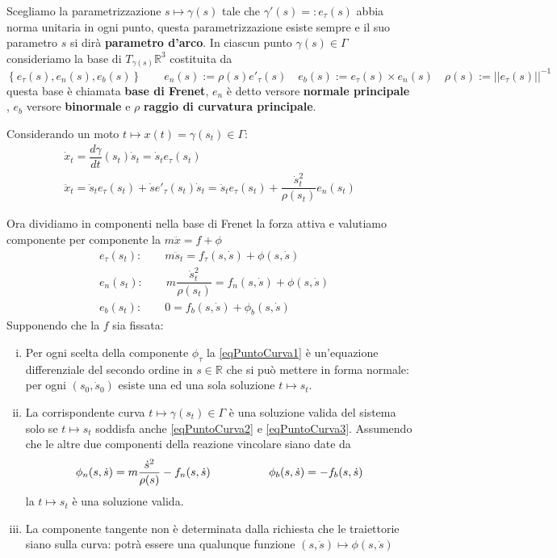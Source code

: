 \documentclass[11pt,a4paper,twoside]{book}
\theoremstyle{esss}
\theoremstyle{dotless}
\numberwithin{equation}{section} %
\begin{document}
Scegliamo la parametrizzazione $s\mapsto\gamma(s)$ tale che $\gamma'(s)=:e_\tau (s)$ abbia norma unitaria in ogni punto, questa parametrizzazione esiste sempre e il suo parametro $s$ si dirà \textbf{parametro d'arco}.
In ciascun punto $\gamma(s)\in\Gamma$ consideriamo la base di $T_{\gamma(s)}\mathbb{R}^3$ costituita da 
\begin{equation}
\left\{ e_\tau(s),e_n(s),e_b(s) \right\} \qquad e_n(s):=\rho(s)e'_\tau(s) \quad e_b(s):=e_\tau(s)\times e_n(s) \quad \rho(s):=\left|\left| e_\tau(s)\right|\right|^{-1}
\end{equation}
questa base è chiamata \textbf{base di Frenet}, $e_n$ è detto versore \textbf{normale principale} , $e_b$ versore \textbf{binormale} e $\rho$ \textbf{raggio di curvatura principale}.

Considerando un moto $t\mapsto x(t)=\gamma(s_t)\in\Gamma$:
\begin{gather*}
\dot{x}_t=\dfrac{d\gamma}{dt}(s_t) \dot{s}_t = \dot{s}_t e_\tau(s_t)\\
\ddot{x}_t=\ddot{s}_t e_\tau(s_t) + \dot{s} e'_\tau (s_t) \dot{s}_t = \ddot{s}_t e_\tau(s_t) + \dfrac{\dot{s}^2_t}{\rho(s_t)}e_n(s_t)
\end{gather*}

Ora dividiamo in componenti nella base di Frenet la forza attiva e valutiamo componente per componente la $m\ddot{x}=f+\phi$
\begin{align}
&e_\tau (s_t): \qquad m\ddot{s}_t = f_\tau(s,\dot{s}) + \phi(s,\dot{s}) \label{eqPuntoCurva1}\\
&e_n(s_t): \qquad m \dfrac{\dot{s}^2_t}{\rho(s_t)} = f_n (s,\dot{s}) + \phi(s,\dot{s}) \label{eqPuntoCurva2}\\
&e_b(s_t): \qquad 0 = f_b(s,\dot{s}) + \phi_b(s,\dot{s}) \label{eqPuntoCurva3}
\end{align}
Supponendo che la $f$ sia fissata:\begin{enumerate}[i.]
\item Per ogni scelta della componente $\phi_\tau$ la \eqref{eqPuntoCurva1} è un'equazione differenziale del secondo ordine in $s\in\mathbb{R}$ che si può mettere in forma normale: per ogni $(s_0,\dot{s}_0)$ esiste una ed una sola soluzione $t\mapsto s_t$.
\item La corrispondente curva $t\mapsto\gamma(s_t)\in\Gamma$ è una soluzione valida del sistema solo se $t\mapsto s_t$ soddisfa anche \eqref{eqPuntoCurva2} e \eqref{eqPuntoCurva3}. 
Assumendo che le altre due componenti della reazione vincolare siano date da
\begin{equation}
\phi_n(s,\dot{s})=m\dfrac{\dot{s}^2}{\rho(s)}-f_n(s,\dot{s}) \hspace{0.15\linewidth} \phi_b(s,\dot{s})=-f_b(s,\dot{s})
\end{equation}
la $t\mapsto s_t$ è una soluzione valida.
\item La componente tangente non è determinata dalla richiesta che le traiettorie siano sulla curva: potrà essere una qualunque funzione $(s,\dot{s})\mapsto \phi(s,\dot{s})$
\end{enumerate}
\end{document}
